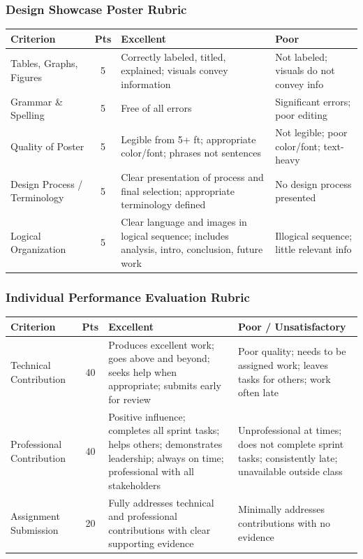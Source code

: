 \subsubsection{Design Showcase Poster Rubric}
\label{sssec:rubric-poster}

{\small
\begin{longtable}{p{4cm} c p{4.5cm} p{3.5cm}}
\toprule
\textbf{Criterion} & \textbf{Pts} & \textbf{Excellent} & \textbf{Poor} \\
\midrule
\endfirsthead
\bottomrule
\endfoot

Tables, Graphs, Figures & 5 & Correctly labeled, titled, explained; visuals convey information & Not labeled; visuals do not convey info \\
\addlinespace
Grammar \& Spelling & 5 & Free of all errors & Significant errors; poor editing \\
\addlinespace
Quality of Poster & 5 & Legible from 5+ ft; appropriate color/font; phrases not sentences & Not legible; poor color/font; text-heavy \\
\addlinespace
Design Process / Terminology & 5 & Clear presentation of process and final selection; appropriate terminology defined & No design process presented \\
\addlinespace
Logical Organization & 5 & Clear language and images in logical sequence; includes analysis, intro, conclusion, future work & Illogical sequence; little relevant info \\

\end{longtable}
}

\subsubsection{Individual Performance Evaluation Rubric}
\label{sssec:rubric-ipe}

{\small
\begin{longtable}{p{3.5cm} c p{4cm} p{4cm}}
\toprule
\textbf{Criterion} & \textbf{Pts} & \textbf{Excellent} & \textbf{Poor / Unsatisfactory} \\
\midrule
\endfirsthead
\bottomrule
\endfoot

Technical Contribution & 40 & Produces excellent work; goes above and beyond; seeks help when appropriate; submits early for review & Poor quality; needs to be assigned work; leaves tasks for others; work often late \\
\addlinespace
Professional Contribution & 40 & Positive influence; completes all sprint tasks; helps others; demonstrates leadership; always on time; professional with all stakeholders & Unprofessional at times; does not complete sprint tasks; consistently late; unavailable outside class \\
\addlinespace
Assignment Submission & 20 & Fully addresses technical and professional contributions with clear supporting evidence & Minimally addresses contributions with no evidence \\

\end{longtable}
}

